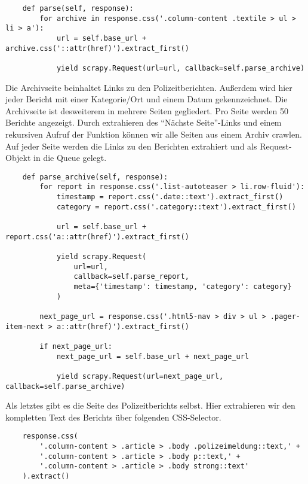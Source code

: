 \begin{verbatim}
    def parse(self, response):
        for archive in response.css('.column-content .textile > ul > li > a'):
            url = self.base_url + archive.css('::attr(href)').extract_first()

            yield scrapy.Request(url=url, callback=self.parse_archive)
    \end{verbatim}

Die Archivseite beinhaltet Links zu den Polizeitberichten. Außerdem wird hier jeder Bericht mit einer Kategorie/Ort
und einem Datum gekennzeichnet. Die Archivseite ist desweiterem in mehrere Seiten gegliedert. Pro Seite werden 50 Berichte angezeigt.
Durch extrahieren des "`Nächste Seite"'-Links und einem rekursiven Aufruf der Funktion können wir alle Seiten aus einem
Archiv crawlen. Auf jeder Seite werden die Links zu den Berichten extrahiert und als Request-Objekt in die Queue gelegt.

\begin{verbatim}
    def parse_archive(self, response):
        for report in response.css('.list-autoteaser > li.row-fluid'):
            timestamp = report.css('.date::text').extract_first()
            category = report.css('.category::text').extract_first()

            url = self.base_url + report.css('a::attr(href)').extract_first()

            yield scrapy.Request(
                url=url,
                callback=self.parse_report,
                meta={'timestamp': timestamp, 'category': category}
            )

        next_page_url = response.css('.html5-nav > div > ul > .pager-item-next > a::attr(href)').extract_first()

        if next_page_url:
            next_page_url = self.base_url + next_page_url

            yield scrapy.Request(url=next_page_url, callback=self.parse_archive)
    \end{verbatim}

\pagebreak

Als letztes gibt es die Seite des Polizeitberichts selbst.
Hier extrahieren wir den kompletten Text des Berichts über folgenden CSS-Selector.

\begin{verbatim}
    response.css(
        '.column-content > .article > .body .polizeimeldung::text,' +
        '.column-content > .article > .body p::text,' +
        '.column-content > .article > .body strong::text'
    ).extract()
    \end{verbatim}

